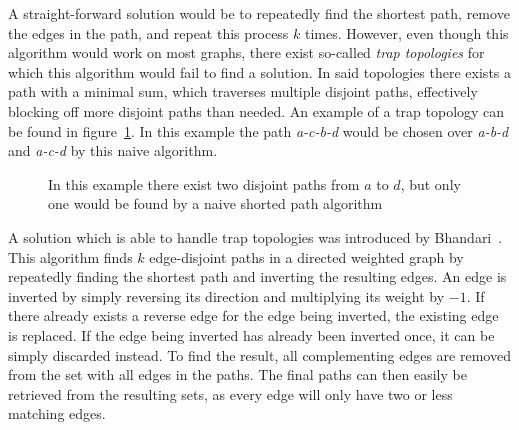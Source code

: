 A straight-forward solution would be to repeatedly find the shortest path, remove the edges in the path, and repeat this process $k$ times. However, even though this algorithm would work on most graphs, there exist so-called \textit{trap topologies} for which this algorithm would fail to find a solution. In said topologies there exists a path with a minimal sum, which traverses multiple disjoint paths, effectively blocking off more disjoint paths than needed. An example of a trap topology can be found in figure~\ref{contr:trap-topology}. In this example the path \textit{a-c-b-d} would be chosen over \textit{a-b-d} and \textit{a-c-d} by this naive algorithm.


\begin{figure}[h]
    \centering
    \caption{In this example there exist two disjoint paths from $a$ to $d$, but only one would be found by a naive shorted path algorithm}
    \label{contr:trap-topology}
\end{figure}

A solution which is able to handle trap topologies was introduced by Bhandari~\cite{bhandari}. This algorithm finds $k$ edge-disjoint paths in a directed weighted graph by repeatedly finding the shortest path and inverting the resulting edges. An edge is inverted by simply reversing its direction and multiplying its weight by $-1$. If there already exists a reverse edge for the edge being inverted, the existing edge is replaced. If the edge being inverted has already been inverted once, it can be simply discarded instead.
To find the result, all complementing edges are removed from the set with all edges in the paths. The final paths can then easily be retrieved from the resulting sets, as every edge will only have two or less matching edges.

